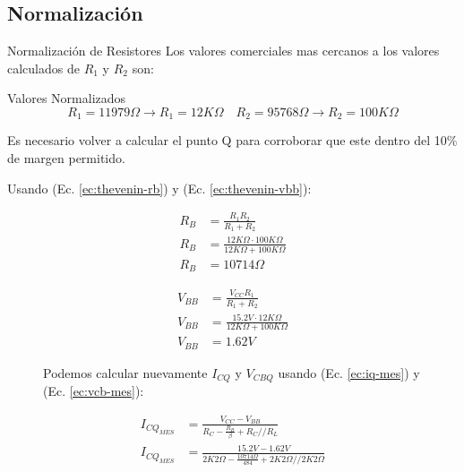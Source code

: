 \subsection{Normalización}
\begin{frame}[allowframebreaks]{Normalización de Resistores}
  Los valores comerciales mas cercanos a los valores calculados de $R_1$ y $R_2$ son:
  \begin{block}{Valores Normalizados}
    \begin{equation*}
      R_1 = 11979\Omega \to R_1 = 12K\Omega \quad R_2 = 95768\Omega \to R_2 = 100K\Omega
    \end{equation*}
  \end{block}
  Es necesario volver a calcular el punto Q para corroborar que este dentro del 10\% de margen permitido.

  Usando (Ec. \ref{ec:thevenin-rb}) y (Ec. \ref{ec:thevenin-vbb}):
  \begin{figure}[!ht]
    \begin{minipage}{0.45\textwidth}
      \begin{align*}
        R_B &= \frac{R_1 R_2}{R_1 + R_2}\\[6pt]
        R_B &= \frac{12K\Omega \cdot 100K\Omega}{12K\Omega + 100K\Omega}\\[6pt]
        R_B &= 10714\Omega
      \end{align*}
    \end{minipage}
    \hfill
    \begin{minipage}{0.45\textwidth}
      \begin{align*}
        V_{BB} &= \frac{V_{CC} R_1}{R_1 + R_2}\\[6pt]
        V_{BB} &= \frac{15.2V \cdot 12K\Omega}{12K\Omega + 100K\Omega}\\[6pt]
        V_{BB} &= 1.62V
      \end{align*}
    \end{minipage}
  \end{figure}
  \begin{figure}[!ht]
    Podemos calcular nuevamente $I_{CQ}$ y $V_{CBQ}$ usando (Ec. \ref{ec:iq-mes}) y (Ec. \ref{ec:vcb-mes}):
    \small
    \begin{minipage}{0.45\textwidth}
      \begin{align*}
        I_{CQ_{MES}} &= \frac{V_{CC} - V_{BB}}{R_C - \frac{R_B}{\beta} + R_C // R_L}\\[6pt]
        I_{CQ_{MES}} &= \frac{15.2V - 1.62V}{2K2\Omega - \frac{10714\Omega}{484} + 2K2\Omega // 2K2\Omega}\\[6pt]

\end{align*}
\end{minipage}
\end{figure}
\end{frame}
